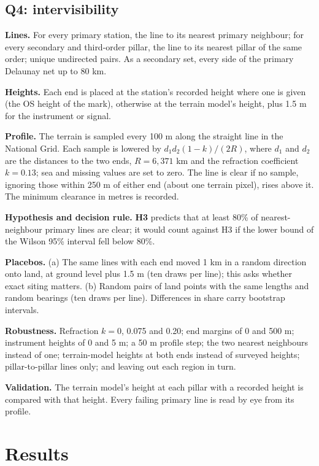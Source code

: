 \documentclass[11pt,a4paper]{article}
\begin{document}
\subsection{Q4: intervisibility}
\textbf{Lines.} For every primary station, the line to its nearest primary neighbour; for every secondary and third-order pillar, the line to its nearest pillar of the same order; unique undirected pairs. As a secondary set, every side of the primary Delaunay net up to 80 km.

\textbf{Heights.} Each end is placed at the station's recorded height where one is given (the OS height of the mark), otherwise at the terrain model's height, plus 1.5 m for the instrument or signal.

\textbf{Profile.} The terrain is sampled every 100 m along the straight line in the National Grid. Each sample is lowered by $d_1 d_2 (1-k)/(2R)$, where $d_1$ and $d_2$ are the distances to the two ends, $R = 6{,}371$ km and the refraction coefficient $k = 0.13$; sea and missing values are set to zero. The line is clear if no sample, ignoring those within 250 m of either end (about one terrain pixel), rises above it. The minimum clearance in metres is recorded.

\textbf{Hypothesis and decision rule.} \textbf{H3} predicts that at least 80\% of nearest-neighbour primary lines are clear; it would count against H3 if the lower bound of the Wilson 95\% interval fell below 80\%.

\textbf{Placebos.} (a) The same lines with each end moved 1 km in a random direction onto land, at ground level plus 1.5 m (ten draws per line); this asks whether exact siting matters. (b) Random pairs of land points with the same lengths and random bearings (ten draws per line). Differences in share carry bootstrap intervals.

\textbf{Robustness.} Refraction $k = 0$, 0.075 and 0.20; end margins of 0 and 500 m; instrument heights of 0 and 5 m; a 50 m profile step; the two nearest neighbours instead of one; terrain-model heights at both ends instead of surveyed heights; pillar-to-pillar lines only; and leaving out each region in turn.

\textbf{Validation.} The terrain model's height at each pillar with a recorded height is compared with that height. Every failing primary line is read by eye from its profile.

\section{Results}\label{sec:results}
\end{document}
